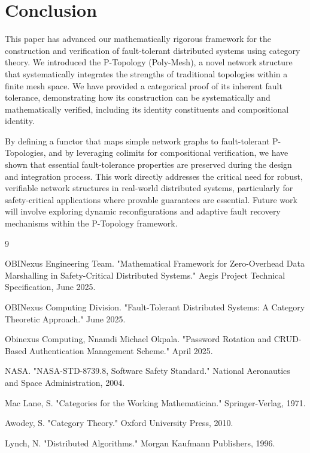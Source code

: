 \documentclass[10pt]{article}
\begin{document}
\section{Conclusion}
This paper has advanced our mathematically rigorous framework for the construction and verification of fault-tolerant distributed systems using category theory. We introduced the P-Topology (Poly-Mesh), a novel network structure that systematically integrates the strengths of traditional topologies within a finite mesh space. We have provided a categorical proof of its inherent fault tolerance, demonstrating how its construction can be systematically and mathematically verified, including its identity constituents and compositional identity.

By defining a functor that maps simple network graphs to fault-tolerant P-Topologies, and by leveraging colimits for compositional verification, we have shown that essential fault-tolerance properties are preserved during the design and integration process. This work directly addresses the critical need for robust, verifiable network structures in real-world distributed systems, particularly for safety-critical applications where provable guarantees are essential. Future work will involve exploring dynamic reconfigurations and adaptive fault recovery mechanisms within the P-Topology framework.

\begin{thebibliography}{9}

OBINexus Engineering Team. "Mathematical Framework for Zero-Overhead Data Marshalling in Safety-Critical Distributed Systems." Aegis Project Technical Specification, June 2025.

OBINexus Computing Division. "Fault-Tolerant Distributed Systems: A Category Theoretic Approach." June 2025.

Obinexus Computing, Nnamdi Michael Okpala. "Password Rotation and CRUD-Based Authentication Management Scheme." April 2025.

NASA. "NASA-STD-8739.8, Software Safety Standard." National Aeronautics and Space Administration, 2004.

Mac Lane, S. "Categories for the Working Mathematician." Springer-Verlag, 1971.

Awodey, S. "Category Theory." Oxford University Press, 2010.

Lynch, N. "Distributed Algorithms." Morgan Kaufmann Publishers, 1996.

\end{thebibliography}
\end{document}
